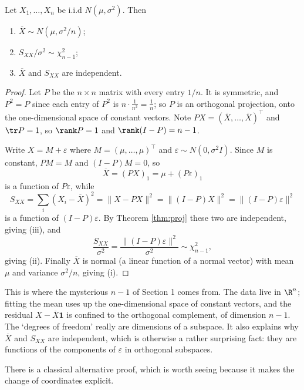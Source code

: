 \begin{theorem}\label{thm:xbarsxx}
  Let $X_1,\dots,X_n$ be i.i.d $N(\mu,\sigma^2)$. Then
  \begin{enumerate}[label=(\roman*)]
    \item $\overline{X}\sim N\left(\mu, \sigma^2/n\right)$;
    \item $S_{XX}/\sigma^2 \sim \chi^2_{n-1}$;
    \item $\overline{X}$ and $S_{XX}$ are independent.
  \end{enumerate}
\end{theorem}
\begin{proof}
  Let $P$ be the $n\times n$ matrix with every entry $1/n$. It is symmetric, and $P^2 = P$ since each entry of $P^2$ is $n \cdot \frac{1}{n^2} = \frac 1n$; so $P$ is an orthogonal projection, onto the one-dimensional space of constant vectors. Note $PX = (\overline{X},\dots,\overline{X})^\top$ and $\tr P = 1$, so $\rank P = 1$ and $\rank(I-P) = n-1$.

  Write $X = M + \varepsilon$ where $M = (\mu,\dots,\mu)^\top$ and $\varepsilon \sim N(0,\sigma^2 I)$. Since $M$ is constant, $PM = M$ and $(I-P)M = 0$, so
  $$
  \overline{X} = (PX)_1 = \mu + (P\varepsilon)_1
  $$
  is a function of $P\varepsilon$, while
  $$
  S_{XX} = \sum_i(X_i - \overline{X})^2 = \|X - PX\|^2 = \|(I-P)X\|^2 = \|(I-P)\varepsilon\|^2
  $$
  is a function of $(I-P)\varepsilon$. By Theorem \ref{thm:proj} these two are independent, giving (iii), and
  $$
  \frac{S_{XX}}{\sigma^2} = \frac{\|(I-P)\varepsilon\|^2}{\sigma^2} \sim \chi^2_{n-1},
  $$
  giving (ii). Finally $\overline{X}$ is normal (a linear function of a normal vector) with mean $\mu$ and variance $\sigma^2/n$, giving (i).
\end{proof}

\begin{remark}
  This is where the mysterious $n-1$ of Section 1 comes from. The data live in $\R^n$; fitting the mean uses up the one-dimensional space of constant vectors, and the residual $X - \overline{X}\mathbf{1}$ is confined to the orthogonal complement, of dimension $n-1$. The `degrees of freedom' really are dimensions of a subspace. It also explains why $\overline X$ and $S_{XX}$ are independent, which is otherwise a rather surprising fact: they are functions of the components of $\varepsilon$ in orthogonal subspaces.
\end{remark}

There is a classical alternative proof, which is worth seeing because it makes the change of coordinates explicit.

